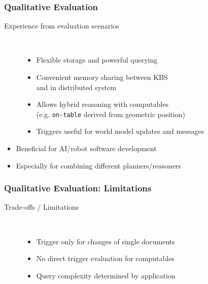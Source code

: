 \begin{frame}
  \frametitle{Qualitative Evaluation}
  \begin{description}
  \item[Experience from evaluation scenarios]%
                \hfill \\
    \begin{itemize}
    \item Flexible storage and powerful querying
    \item Convenient memory sharing between KBS\\ and in distributed system
    \item Allows hybrid reasoning with computables\\(e.g. \texttt{on-table} derived from geometric position)
    \item Triggers useful for world model updates and messages
    \end{itemize}
  \end{description}
\begin{block}{}%
  \begin{itemize}
  \item Beneficial for AI/robot software development
  \item Especially for combining different planners/reasoners
  \end{itemize}
  \end{block}
\end{frame}

\begin{frame}
  \frametitle{Qualitative Evaluation: Limitations}
  \begin{description}
  \item[Trade-offs / Limitations]
                \hfill \\
\bigskip
    \begin{itemize}
    \item Trigger only for changes of single documents %
\vspace{0.15cm}
    \item No direct trigger evaluation for computables %
\vspace{0.15cm}
    \item Query complexity determined by application %
    \end{itemize}
  \end{description}
\end{frame}

